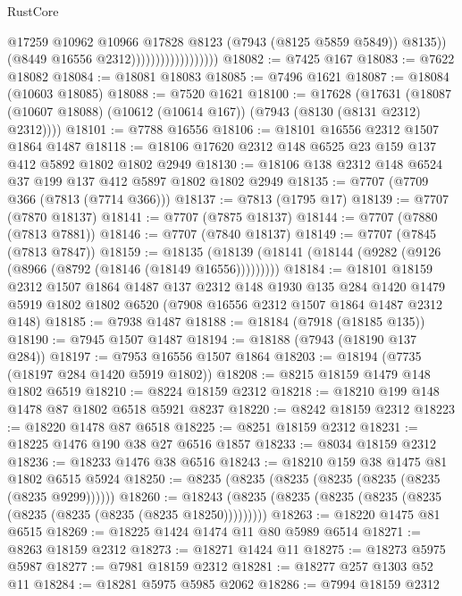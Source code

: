 \begin{lexlean}{RustCore}
\begin{coremodule}
                                          @17259
                                          @10962
                                          @10966
                                          @17828
                                          @8123
                                          (@7943 (@8125 @5859 @5849))
                                          @8135))
                                      (@8449 @16556 @2312))))))))))))))))))
@18082 := @7425 @167
@18083 := @7622 @18082
@18084 := @18081 @18083
@18085 := @7496 @1621
@18087 := @18084 (@10603 @18085)
@18088 := @7520 @1621
@18100 := @17628
    (@17631 (@18087 (@10607 @18088) (@10612 (@10614 @167)) (@7943 (@8130 (@8131 @2312) @2312))))
@18101 := @7788 @16556
@18106 := @18101 @16556 @2312 @1507 @1864 @1487
@18118 := @18106 @17620 @2312 @148 @6525 @23 @159 @137 @412 @5892 @1802 @1802 @2949
@18130 := @18106 @138 @2312 @148 @6524 @37 @199 @137 @412 @5897 @1802 @1802 @2949
@18135 := @7707 (@7709 @366 (@7813 (@7714 @366)))
@18137 := @7813 (@1795 @17)
@18139 := @7707 (@7870 @18137)
@18141 := @7707 (@7875 @18137)
@18144 := @7707 (@7880 (@7813 @7881))
@18146 := @7707 (@7840 @18137)
@18149 := @7707 (@7845 (@7813 @7847))
@18159 := @18135 (@18139 (@18141 (@18144 (@9282 (@9126 (@8966 (@8792 (@18146 (@18149 @16556)))))))))
@18184 := @18101
    @18159
    @2312
    @1507
    @1864
    @1487
    @137
    @2312
    @148
    @1930
    @135
    @284
    @1420
    @1479
    @5919
    @1802
    @1802
    @6520
    (@7908 @16556 @2312 @1507 @1864 @1487 @2312 @148)
@18185 := @7938 @1487
@18188 := @18184 (@7918 (@18185 @135))
@18190 := @7945 @1507 @1487
@18194 := @18188 (@7943 (@18190 @137 @284))
@18197 := @7953 @16556 @1507 @1864
@18203 := @18194 (@7735 (@18197 @284 @1420 @5919 @1802))
@18208 := @8215 @18159 @1479 @148 @1802 @6519
@18210 := @8224 @18159 @2312
@18218 := @18210 @199 @148 @1478 @87 @1802 @6518 @5921 @8237
@18220 := @8242 @18159 @2312
@18223 := @18220 @1478 @87 @6518
@18225 := @8251 @18159 @2312
@18231 := @18225 @1476 @190 @38 @27 @6516 @1857
@18233 := @8034 @18159 @2312
@18236 := @18233 @1476 @38 @6516
@18243 := @18210 @159 @38 @1475 @81 @1802 @6515 @5924
@18250 := @8235 (@8235 (@8235 (@8235 (@8235 (@8235 (@8235 @9299))))))
@18260 := @18243 (@8235 (@8235 (@8235 (@8235 (@8235 (@8235 (@8235 (@8235 (@8235 @18250)))))))))
@18263 := @18220 @1475 @81 @6515
@18269 := @18225 @1424 @1474 @11 @80 @5989 @6514
@18271 := @8263 @18159 @2312
@18273 := @18271 @1424 @11
@18275 := @18273 @5975 @5987
@18277 := @7981 @18159 @2312
@18281 := @18277 @257 @1303 @52 @11
@18284 := @18281 @5975 @5985 @2062
@18286 := @7994 @18159 @2312

\end{coremodule}
\end{lexlean}

